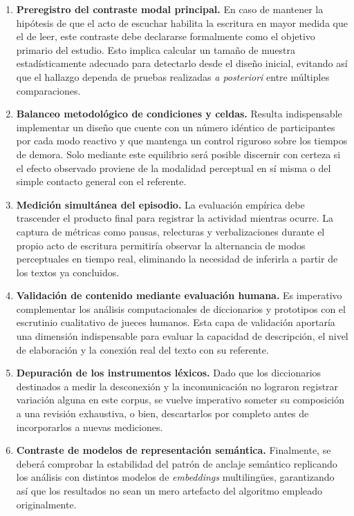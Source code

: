 \documentclass[12pt]{article}
\begin{document}
	\begin{enumerate}
		\item \textbf{Preregistro del contraste modal principal.} En caso de mantener la hipótesis de que el acto de escuchar habilita la escritura en mayor medida que el de leer, este contraste debe declararse formalmente como el objetivo primario del estudio. Esto implica calcular un tamaño de muestra estadísticamente adecuado para detectarlo desde el diseño inicial, evitando así que el hallazgo dependa de pruebas realizadas \emph{a posteriori} entre múltiples comparaciones.
		
		\item \textbf{Balanceo metodológico de condiciones y celdas.} Resulta indispensable implementar un diseño que cuente con un número idéntico de participantes por cada modo reactivo y que mantenga un control riguroso sobre los tiempos de demora. Solo mediante este equilibrio será posible discernir con certeza si el efecto observado proviene de la modalidad perceptual en sí misma o del simple contacto general con el referente.
		
		\item \textbf{Medición simultánea del episodio.} La evaluación empírica debe trascender el producto final para registrar la actividad mientras ocurre. La captura de métricas como pausas, relecturas y verbalizaciones durante el propio acto de escritura permitiría observar la alternancia de modos perceptuales en tiempo real, eliminando la necesidad de inferirla a partir de los textos ya concluidos.
		
		\item \textbf{Validación de contenido mediante evaluación humana.} Es imperativo complementar los análisis computacionales de diccionarios y prototipos con el escrutinio cualitativo de jueces humanos. Esta capa de validación aportaría una dimensión indispensable para evaluar la capacidad de descripción, el nivel de elaboración y la conexión real del texto con su referente.
		
		\item \textbf{Depuración de los instrumentos léxicos.} Dado que los diccionarios destinados a medir la desconexión y la incomunicación no lograron registrar variación alguna en este corpus, se vuelve imperativo someter su composición a una revisión exhaustiva, o bien, descartarlos por completo antes de incorporarlos a nuevas mediciones.
		
		\item \textbf{Contraste de modelos de representación semántica.} Finalmente, se deberá comprobar la estabilidad del patrón de anclaje semántico replicando los análisis con distintos modelos de \emph{embeddings} multilingües, garantizando así que los resultados no sean un mero artefacto del algoritmo empleado originalmente.
	\end{enumerate}
	
\end{document}
